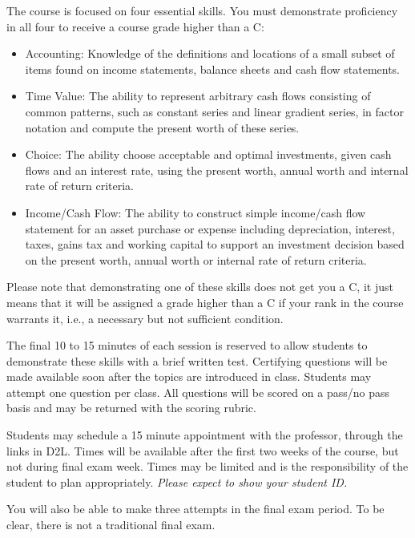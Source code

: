 \documentclass[letterpaper,10pt]{article}
\begin{document}
The course is focused on four essential skills. You must
demonstrate proficiency in all four to receive a course grade higher than a C:

\begin{itemize}

\item Accounting: Knowledge of the definitions and locations of a
  small subset of items found on income statements, balance sheets and
  cash flow statements.

\item Time Value: The ability to represent arbitrary cash flows
  consisting of common patterns, such as constant series and linear
  gradient series, in factor notation and compute the present worth of
  these series.

\item Choice: The ability choose acceptable and optimal investments,
  given cash flows and an interest rate, using the present worth,
  annual worth and internal rate of return criteria.

\item Income/Cash Flow: The ability to construct simple income/cash
  flow statement for an asset purchase or expense including
  depreciation, interest, taxes, gains tax and working capital to
  support an investment decision based on the present worth, annual
  worth or internal rate of return criteria.
\end{itemize}

Please note that demonstrating one of these skills does not get you a
C, it just means that it will be assigned a grade higher than a C if
your rank in the course warrants it, i.e., a necessary but not sufficient condition.

The final 10 to 15 minutes of each session is reserved to allow
students to demonstrate these skills with a brief written test.
Certifying questions will be made available soon after the topics are introduced in class. Students may attempt one question per class.  All questions
will be scored on a pass/no pass basis and may be returned with the
scoring rubric.  

Students may schedule a 15 minute appointment with the professor, through the links
in D2L. Times will be available after the first two weeks
of the course, but not during final exam week.  Times may be limited
and is the responsibility of the student to plan appropriately.
\emph{Please expect to show your student ID.}

You will also be able to make three attempts in the
final exam period.   To be clear, there is not a traditional final exam.
\end{document}
